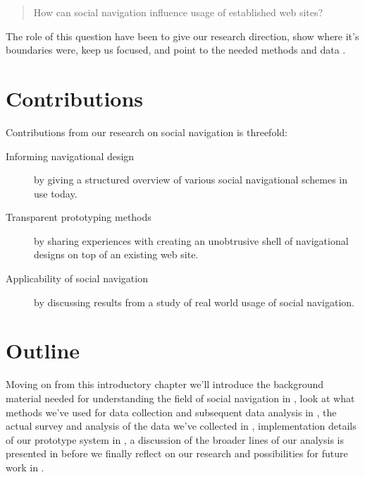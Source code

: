 \begin{quote}
  How can social navigation influence usage of established web sites?
\end{quote}

The role of this question have been to give our research direction, show where
it's boundaries were, keep us focused, and point to the needed methods and
data \citep[p.~77]{silverman05}.


\section{Contributions}

Contributions from our research on social navigation is threefold:

\begin{description}
  \item[Informing navigational design] by giving a structured overview of
    various social navigational schemes in use today.
  \item[Transparent prototyping methods] by sharing experiences with
    creating an unobtrusive shell of navigational designs on top of an
    existing web site.
  \item[Applicability of social navigation] by discussing results from
    a study of real world usage of social navigation.
\end{description}

\section{Outline}

Moving on from this introductory chapter we'll introduce the background
material needed for understanding the field of social
navigation in , look at what methods we've
used for data collection and subsequent data analysis in
, the actual survey and analysis of the data
we've collected in , implementation details
of our prototype system in , a discussion of the
broader lines of our analysis is presented in 
before we finally reflect on our research and possibilities for future work
in .
